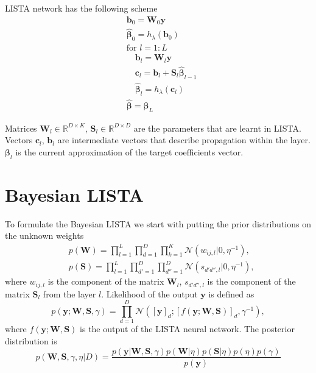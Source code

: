 \documentclass[letterpaper]{article}
\begin{document}
LISTA network has the following scheme
\begin{align}
&\mathbf{b}_0 = \mathbf{W}_0\mathbf{y}\\
&\widehat{\boldsymbol\beta}_0 = h_\lambda(\mathbf{b}_0) \\
&\text{for } l=1:L\\
	&\quad \mathbf{b}_l = \mathbf{W}_l \mathbf{y} \\
	&\quad \mathbf{c}_l = \mathbf{b}_l + \mathbf{S}_l\widehat{\boldsymbol\beta}_{l-1} \\
	&\quad \widehat{\boldsymbol\beta}_{l} = h_\lambda(\mathbf{c}_l) \\
& \widehat{\boldsymbol\beta} = \widehat{\boldsymbol\beta}_{L}
\end{align}

Matrices $\mathbf{W}_l \in \mathbb{R}^{D \times K}$, $\mathbf{S}_l\in\mathbb{R}^{D \times D}$ are the parameters that are learnt in LISTA. Vectors $\mathbf{c}_l$, $\mathbf{b}_l$ are intermediate vectors that describe propagation within the layer. $\boldsymbol\beta_l$ is the current approximation of the target coefficients vector.

\section{Bayesian LISTA}
To formulate the Bayesian LISTA we start with putting the prior distributions on the unknown weights
\begin{align}
&p(\mathbf{W}) = \prod_{l=1}^L\prod_{d=1}^D\prod_{k=1}^K \mathcal{N}(w_{ij, l} | 0, \eta^{-1}), \\
&p(\mathbf{S}) = \prod_{l=1}^L\prod_{d'=1}^D\prod_{d''=1}^D \mathcal{N}(s_{d'd'', l} | 0, \eta^{-1}),
\end{align}
where $w_{ij, l}$ is the component of the matrix $\mathbf{W}_l$, $s_{d'd'', l}$ is the component of the matrix $\mathbf{S}_l$ from the layer $l$.
Likelihood of the output $\mathbf{y}$ is defined as 
\begin{equation}
\label{eq:likelihood}
p(\mathbf{y}; \mathbf{W}, \mathbf{S}, \gamma) = \prod_{d=1}^D\mathcal{N}([\mathbf{y}]_d; [f(\mathbf{y}; \mathbf{W}, \mathbf{S})]_d, \gamma^{-1}),
\end{equation}
where $f(\mathbf{y}; \mathbf{W}, \mathbf{S})$ is the output of the LISTA neural network.
The posterior distribution is 
\begin{equation}
\label{eq:posterior}
p(\mathbf{W}, \mathbf{S}, \gamma, \eta | D) = \frac{p(\mathbf{y} | \mathbf{W},  \mathbf{S}, \gamma) p(\mathbf{W} | \eta )p(\mathbf{S} | \eta) p(\eta) p(\gamma)}{p(\mathbf{y})}
\end{equation}
\end{document}
